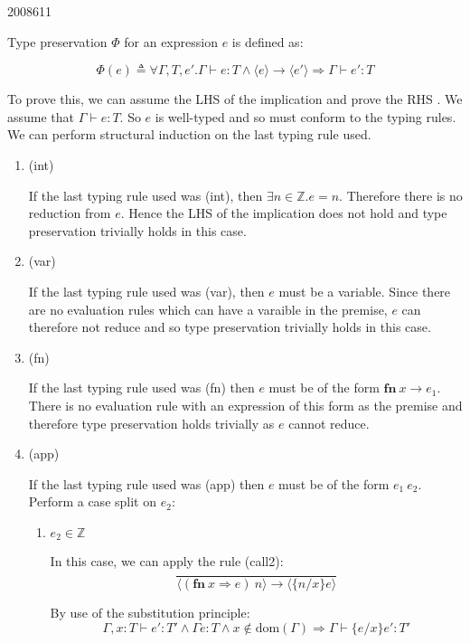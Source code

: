\documentclass[10pt,\jkfside,a4paper]{article}
\begin{document}
\begin{examquestion}{2008}{6}{11}
\begin{enumerate}[label=(\alph*)]
Type preservation $\Phi$ for an expression $e$ is defined as:

\[
\Phi(e) \triangleq \forall \Gamma, T, e'. \Gamma \vdash e: T \wedge \langle e
\rangle \to \langle e' \rangle \Rightarrow \Gamma \vdash e': T
\]

To prove this, we can assume the LHS of the implication and prove the RHS .
We assume that $\Gamma \vdash e: T$. So $e$ is well-typed and so must
conform to the typing rules. We can perform structural induction on the last
typing rule used.

\begin{enumerate}[label=\textbf{Case}]

\item (int)

If the last typing rule used was (int), then $\exists n \in \mathbb{Z}. e =
n$. Therefore there is no reduction from $e$. Hence the LHS of the
implication does not hold and type preservation trivially holds in this case.

\item (var)

If the last typing rule used was (var), then $e$ must be a variable. Since
there are no evaluation rules which can have a varaible in the premise, $e$
can therefore not reduce and so type preservation trivially holds in this case.

\item (fn)

If the last typing rule used was (fn) then $e$ must be of the form
$\mathbf{fn} \ x \to e_1$. There is no evaluation rule with an expression of
this form as the premise and therefore type preservation holds trivially as
$e$ cannot reduce.

\item (app)

If the last typing rule used was (app) then $e$ must be of the form $e_1 \
e_2$. Perform a case split on $e_2$:

\begin{enumerate}[label=\textbf{case}]

\item $e_2 \in \mathbb{Z}$

In this case, we can apply the rule (call2):
\[
\dfrac{}{
\langle (\mathbf{fn} \ x \Rightarrow e) \ n \rangle \to \langle \{n/x\}e \rangle
}
\]

By use of the substitution principle:
\[
\Gamma, x: T \vdash e' : T' \wedge \Gamma e: T \wedge x \notin \text{dom}
(\Gamma) \Longrightarrow \Gamma \vdash \{e/x\}e': T'
\]


\end{enumerate}
\end{enumerate}
\end{enumerate}
\end{examquestion}
\end{document}
